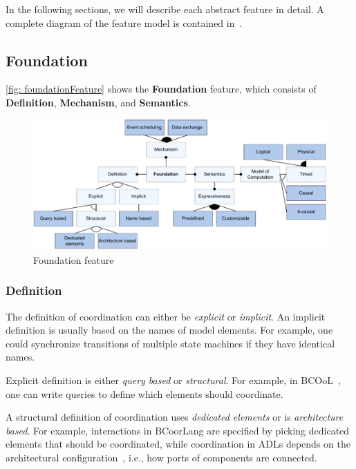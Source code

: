 \documentclass[runningheads]{llncs}
\begin{document}
In the following sections, we will describe each abstract feature in detail.
A complete diagram of the feature model is contained in~\cite{timkrauterArtifactsCoordination2024}.

\subsection{Foundation}

\autoref{fig: foundationFeature} shows the \textbf {Foundation} feature, which consists of \textbf{Definition}, \textbf{Mechanism}, and \textbf{Semantics}.

\begin{figure}[ht]
	\centering
	\includegraphics[width=1\textwidth]{images/coordination_feature}
	\caption{Foundation feature}
	\label{fig: foundationFeature}
\end{figure}

\subsubsection{Definition} The definition of coordination can either be \textit{explicit} or \textit{implicit}.
An implicit definition is usually based on the names of model elements.
For example, one could synchronize transitions of multiple state machines if they have identical names.

Explicit definition is either \textit{query based} or \textit{structural}.
For example, in BCOoL~\cite{varalarsenBCOolBehavioralCoordination2016,varalarsenBehavioralCoordinationOperator2015}, one can write queries to define which elements should coordinate.

A structural definition of coordination uses \textit{dedicated elements} or is \textit{architecture based}.
For example, interactions in BCoorLang are specified by picking dedicated elements that should be coordinated, while coordination in ADLs depends on the architectural configuration~\cite{medvidovicClassificationComparisonFramework2000}, i.e., how ports of components are connected.
\end{document}
